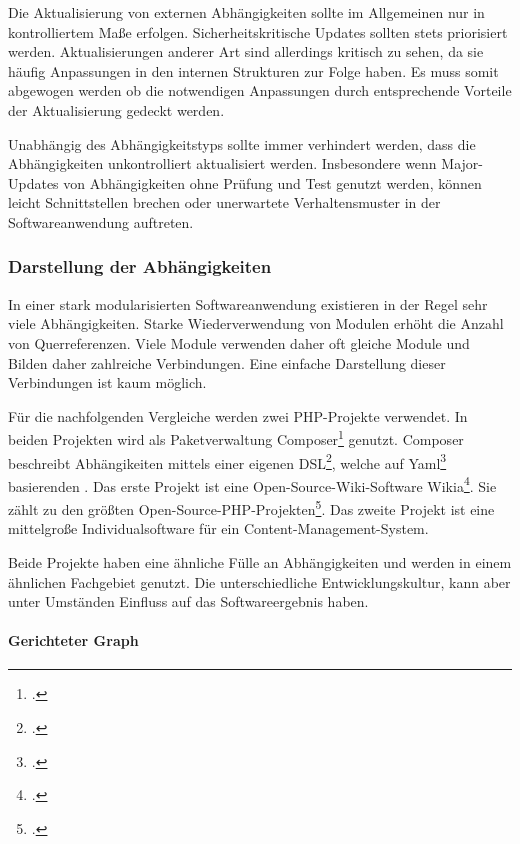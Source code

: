 Die Aktualisierung von externen Abhängigkeiten sollte im Allgemeinen nur in kontrolliertem Maße erfolgen. Sicherheitskritische Updates sollten stets priorisiert werden. Aktualisierungen anderer Art sind allerdings kritisch zu sehen, da sie häufig Anpassungen in den internen Strukturen zur Folge haben. Es muss somit abgewogen werden ob die notwendigen Anpassungen durch entsprechende Vorteile der Aktualisierung gedeckt werden.

Unabhängig des Abhängigkeitstyps sollte immer verhindert werden, dass die Abhängigkeiten unkontrolliert aktualisiert werden. Insbesondere wenn Major-Updates von Abhängigkeiten ohne Prüfung und Test genutzt werden, können leicht Schnittstellen brechen oder unerwartete Verhaltensmuster in der Softwareanwendung auftreten.

\subsubsection{Darstellung der Abhängigkeiten}
\label{subsubsec:illustrate-dependencies}

In einer stark modularisierten Softwareanwendung existieren in der Regel sehr viele Abhängigkeiten. Starke Wiederverwendung von Modulen erhöht die Anzahl von Querreferenzen. Viele Module verwenden daher oft gleiche Module und Bilden daher zahlreiche Verbindungen. Eine einfache Darstellung dieser Verbindungen ist kaum möglich. 

Für die nachfolgenden Vergleiche werden zwei PHP-Projekte verwendet. In beiden Projekten wird als Paketverwaltung Composer\footcite{composer-web} genutzt. Composer beschreibt Abhängikeiten mittels einer eigenen DSL\footcite{composer-json}, welche auf Yaml\footcite{yaml-homepage} basierenden . Das erste Projekt ist eine Open-Source-Wiki-Software \glqq Wikia\grqq{}\footcite{wikia-github}. Sie zählt zu den größten Open-Source-PHP-Projekten\footcite{largest-php-apps-2018}. Das zweite Projekt ist eine mittelgroße Individualsoftware für ein Content-Management-System.

Beide Projekte haben eine ähnliche Fülle an Abhängigkeiten und werden in einem ähnlichen Fachgebiet genutzt. Die unterschiedliche Entwicklungskultur, kann aber unter Umständen Einfluss auf das Softwareergebnis haben.

\paragraph{Gerichteter Graph}

